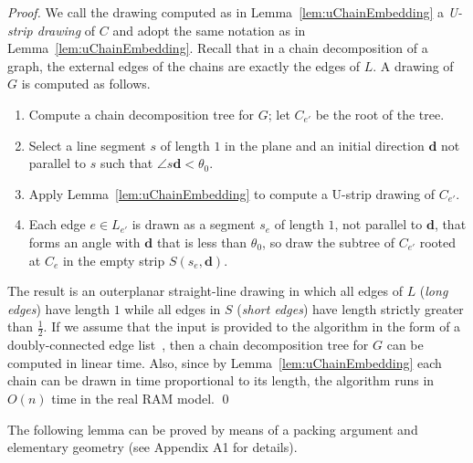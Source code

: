 \documentclass[orivec]{llncs}
\begin{document}
\begin{proof}
 We call the drawing computed as in Lemma~\ref{lem:uChainEmbedding} a {\em U-strip drawing} of $C$ and adopt the same notation as in Lemma~\ref{lem:uChainEmbedding}.  Recall that in a chain decomposition of a graph, the external edges of the chains are exactly the edges of $L$. A drawing of $G$ is computed as follows.
\begin{enumerate}
\item Compute a chain decomposition tree for $G$; let $C_{e'}$ be the root of the tree.
\item Select a line segment $s$ of length $1$ in the plane and an initial direction $\mathbf{d}$ not parallel to $s$ such that $\angle s \mathbf{d} < \theta_0$.
\item Apply Lemma~\ref{lem:uChainEmbedding} to compute a U-strip drawing of $C_{e'}$.
\item Each edge $e \in L_{e'}$ is drawn as a segment $s_e$ of length $1$, not
parallel to $\mathbf{d}$, that forms an angle with $\mathbf{d}$ that is less than $\theta_0$, so draw the subtree of $C_{e'}$ rooted at $C_e$ in the empty strip $S(s_e, \mathbf{d})$.
\end{enumerate}

The result is an outerplanar straight-line drawing in which all edges of $L$ ({\em long edges}) have length $1$ while all edges in $S$ ({\em short edges}) have length strictly greater than $\frac{1}{2}$.
If we assume that the input is provided to the algorithm in the form of a doubly-connected
edge list~\cite{MULLER1978217}, then a chain decomposition tree for $G$ can be computed in
linear time. Also, since by Lemma~\ref{lem:uChainEmbedding} each chain can be drawn in time proportional to its length, the algorithm
runs in $O(n)$ time in the real RAM model.
\qed
\end{proof}

The following lemma can be proved by means of a packing argument and elementary geometry
(see Appendix A1 for details).

\end{document}
